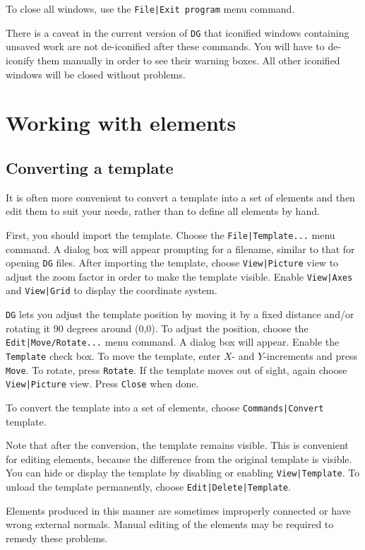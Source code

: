 \documentclass[a4paper,10pt]{report}
\begin{document}
To close all windows, use the {\tt File|Exit program} menu command.

There is a caveat in the current version of {\tt DG} that iconified windows
containing unsaved work are not de-iconified after these commands. You
will have to de-iconify them manually in order to see their warning
boxes. All other iconified windows will be closed without problems.

\section{Working with elements}

\subsection{Converting a template}

It is often more convenient to convert a template into a set of
elements and then edit them to suit your needs, rather than to define
all elements by hand.

First, you should import the template. Choose the
{\tt File|Template...}  menu command. A dialog box will appear
prompting for a filename, similar to that for opening {\tt DG} files. After
importing the template, choose {\tt View|Picture} view to adjust the
zoom factor in order to make the template visible. Enable
{\tt View|Axes} and {\tt View|Grid} to display the coordinate
system.

{\tt DG} lets you adjust the template position by moving it by a fixed
distance and/or rotating it 90 degrees around (0,0). To adjust the
position, choose the {\tt Edit|Move/Rotate...} menu command. A dialog
box will appear. Enable the {\tt Template} check box. To move the
template, enter $X$- and $Y$-increments and press {\tt Move}. To rotate,
press {\tt Rotate}. If the template moves out of sight, again choose
{\tt View|Picture} view. Press {\tt Close} when done.

To convert the template into a set of elements, choose
{\tt Commands|Convert} template.

Note that after the conversion, the template remains visible. This is
convenient for editing elements, because the difference from the
original template is visible. You can hide or display the template by
disabling or enabling {\tt View|Template}. To unload the template
permanently, choose {\tt Edit|Delete|Template}.

Elements produced in this manner are sometimes improperly connected or
have wrong external normals. Manual editing of the elements may be required to
remedy these problems.
\end{document}
